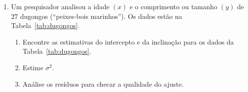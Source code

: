 \documentclass[12pt, a4paper]{article}
\begin{document}
\begin{enumerate}
	\item Um pesquisador analisou a idade $(x)$ e o comprimento ou tamanho $(y)$ de $27$ dugongos (``peixes-bois marinhos''). Os dados estão na Tabela~\ref{tab:dugongos}.
	\begin{table}[ht]
		\centering
		\caption{Peso e tamanho de dugongos.} 
		\label{tab:dugongos}
	\end{table}	
	\begin{enumerate}
		\item Encontre as estimativas do intercepto e da inclinação para os dados da Tabela~\ref{tab:dugongos}.
		\item Estime $\sigma^2$.
		\item Análise os resíduos para checar a qualidade do ajuste.

\end{enumerate}
\end{enumerate}
\end{document}
